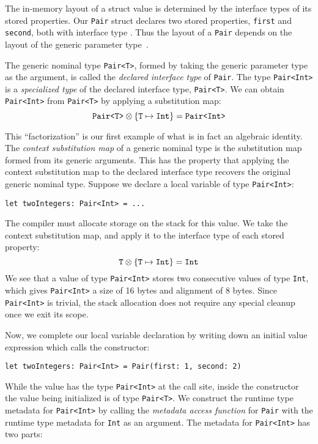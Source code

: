 \documentclass[../generics]{subfiles}
\begin{document}
The in-memory layout of a struct value is determined by the interface types of its stored properties. Our \texttt{Pair} struct declares two stored properties, \texttt{first} and \texttt{second}, both with interface type \tT. Thus the layout of a \texttt{Pair} depends on the layout of the generic parameter type~\tT.

The generic nominal type \texttt{Pair<T>}, formed by taking the generic parameter type as the argument, is called the \emph{declared interface type} of \texttt{Pair}. The type \texttt{Pair<Int>} is a \emph{specialized type} of the declared interface type, \texttt{Pair<T>}. We can obtain \texttt{Pair<Int>} from \texttt{Pair<T>} by applying a substitution map:
\[\texttt{Pair<T>} \otimes \{\texttt{T} \mapsto \texttt{Int}\} = \texttt{Pair<Int>}\]

This ``factorization'' is our first example of what is in fact an algebraic identity. The \emph{context substitution map} of a generic nominal type is the substitution map formed from its generic arguments. This has the property that applying the context substitution map to the declared interface type recovers the original generic nominal type. Suppose we declare a local variable of type \texttt{Pair<Int>}:
\begin{Verbatim}
let twoIntegers: Pair<Int> = ...
\end{Verbatim}
The compiler must allocate storage on the stack for this value. We take the context substitution map, and apply it to the interface type of each stored property:
\[\texttt{T} \otimes \{\texttt{T} \mapsto \texttt{Int}\} = \texttt{Int}\]
We see that a value of type \texttt{Pair<Int>} stores two consecutive values of type \texttt{Int}, which gives \texttt{Pair<Int>} a size of 16 bytes and alignment of 8 bytes. Since \texttt{Pair<Int>} is trivial, the stack allocation does not require any special cleanup once we exit its scope.

Now, we complete our local variable declaration by writing down an initial value expression which calls the constructor:
\begin{Verbatim}
let twoIntegers: Pair<Int> = Pair(first: 1, second: 2)
\end{Verbatim}
While the value has the type \texttt{Pair<Int>} at the call site, inside the constructor the value being initialized is of type \texttt{Pair<T>}. We construct the runtime type metadata for \texttt{Pair<Int>} by calling the \emph{metadata access function} for \texttt{Pair} with the runtime type metadata for \texttt{Int} as an argument. The metadata for \texttt{Pair<Int>} has two parts:
\end{document}
